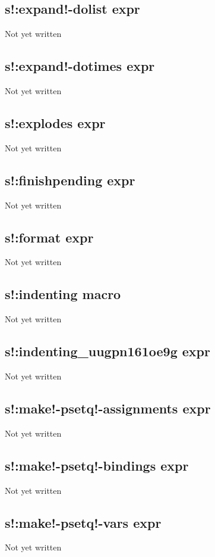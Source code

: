 \documentclass[a4paper,11pt]{article}
\begin{document}
\subsection{\ttfamily s!:expand!-dolist expr}
Not yet written

\subsection{\ttfamily s!:expand!-dotimes expr}
Not yet written

\subsection{\ttfamily s!:explodes expr}
Not yet written

\subsection{\ttfamily s!:finishpending expr}
Not yet written

\subsection{\ttfamily s!:format expr}
Not yet written

\subsection{\ttfamily s!:indenting macro}
Not yet written

\subsection{\ttfamily s!:indenting\_uugpn161oe9g expr}
Not yet written

\subsection{\ttfamily s!:make!-psetq!-assignments expr}
Not yet written

\subsection{\ttfamily s!:make!-psetq!-bindings expr}
Not yet written

\subsection{\ttfamily s!:make!-psetq!-vars expr}
Not yet written
\end{document}
